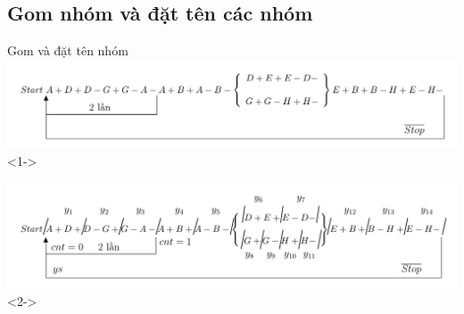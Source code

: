 \documentclass[24pt]{beamer}
\begin{document}
\subsection*{Gom nhóm và đặt tên các nhóm}
\begin{frame}{Gom và đặt tên nhóm}
	\vspace{-.5cm}
	\hspace{-1cm}\includegraphics[scale=0.7]{draw-tikz/quatrinh-bt4.pdf}<1->

	\vspace{.5cm}
	\hspace{-1cm}\includegraphics[scale=0.7]{draw-tikz/quatrinh-bt4-buoc1-gomnhom.pdf}<2->
\end{frame}
\end{document}
